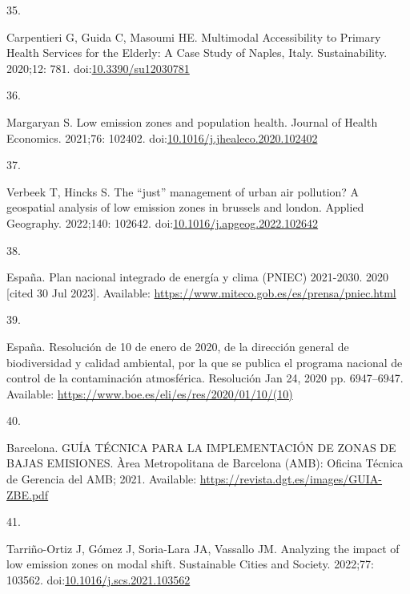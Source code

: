 \documentclass[10pt,letterpaper]{article}
\newlength{\cslhangindent}
\newlength{\csllabelwidth}
\newlength{\cslentryspacingunit} %
\newenvironment{CSLReferences}[2] %
 {%
  \setlength{\parindent}{0pt}
  \ifodd #1
  \let\oldpar\par
  \def\par{\hangindent=\cslhangindent\oldpar}
  \fi
  \setlength{\parskip}{#2\cslentryspacingunit}
 }%
 {}
\newcommand{\CSLLeftMargin}[1]{\parbox[t]{\csllabelwidth}{#1}}
\newcommand{\CSLRightInline}[1]{\parbox[t]{\linewidth - \csllabelwidth}{#1}\break}
\begin{document}
\begin{CSLReferences}{0}{0}
\leavevmode{}%
\CSLLeftMargin{35. }%
\CSLRightInline{Carpentieri G, Guida C, Masoumi HE. Multimodal
{Accessibility} to {Primary Health Services} for the {Elderly}: {A Case
Study} of {Naples}, {Italy}. Sustainability. 2020;12: 781.
doi:\href{https://doi.org/10.3390/su12030781}{10.3390/su12030781}}

\leavevmode{}%
\CSLLeftMargin{36. }%
\CSLRightInline{Margaryan S. Low emission zones and population health.
Journal of Health Economics. 2021;76: 102402.
doi:\href{https://doi.org/10.1016/j.jhealeco.2020.102402}{10.1016/j.jhealeco.2020.102402}}

\leavevmode{}%
\CSLLeftMargin{37. }%
\CSLRightInline{Verbeek T, Hincks S. The {``just''} management of urban
air pollution? A geospatial analysis of low emission zones in brussels
and london. Applied Geography. 2022;140: 102642.
doi:\href{https://doi.org/10.1016/j.apgeog.2022.102642}{10.1016/j.apgeog.2022.102642}}

\leavevmode{}%
\CSLLeftMargin{38. }%
\CSLRightInline{España. Plan nacional integrado de energía y clima
({PNIEC}) 2021-2030. 2020 {[}cited 30 Jul 2023{]}. Available:
\url{https://www.miteco.gob.es/es/prensa/pniec.html}}

\leavevmode{}%
\CSLLeftMargin{39. }%
\CSLRightInline{España. Resolución de 10 de enero de 2020, de la
dirección general de biodiversidad y calidad ambiental, por la que se
publica el programa nacional de control de la contaminación atmosférica.
Resolución Jan 24, 2020 pp. 6947--6947. Available:
\url{https://www.boe.es/eli/es/res/2020/01/10/(10)}}

\leavevmode{}%
\CSLLeftMargin{40. }%
\CSLRightInline{Barcelona. {GUÍA} {TÉCNICA} {PARA} {LA} {IMPLEMENTACIÓN}
{DE} {ZONAS} {DE} {BAJAS} {EMISIONES}. Àrea Metropolitana de Barcelona
({AMB}): Oficina Técnica de Gerencia del {AMB}; 2021. Available:
\url{https://revista.dgt.es/images/GUIA-ZBE.pdf}}

\leavevmode{}%
\CSLLeftMargin{41. }%
\CSLRightInline{Tarriño-Ortiz J, Gómez J, Soria-Lara JA, Vassallo JM.
Analyzing the impact of low emission zones on modal shift. Sustainable
Cities and Society. 2022;77: 103562.
doi:\href{https://doi.org/10.1016/j.scs.2021.103562}{10.1016/j.scs.2021.103562}}


\end{CSLReferences}
\end{document}

